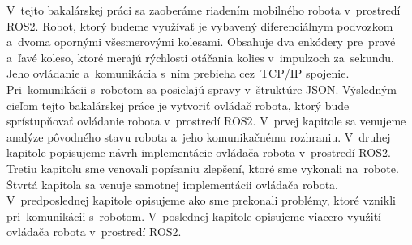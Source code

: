V~tejto bakalárskej práci sa zaoberáme riadením mobilného robota v~prostredí ROS2. Robot, ktorý budeme využívať
je vybavený diferenciálnym podvozkom a~dvoma opornými všesmerovými kolesami. Obsahuje dva enkódery pre~pravé
a~ľavé koleso, ktoré merajú rýchlosti otáčania kolies v~impulzoch za~sekundu. Jeho ovládanie a~komunikácia
s~ním prebieha cez~TCP/IP spojenie. Pri~komunikácii s~robotom sa posielajú spravy v~štruktúre JSON.
Výsledným cieľom tejto bakalárskej práce je vytvoriť ovládač robota, ktorý bude sprístupňovať ovládanie robota
v~prostredí ROS2. V~prvej kapitole sa venujeme analýze pôvodného stavu robota a~jeho komunikačnému rozhraniu.
V~druhej kapitole popisujeme návrh implementácie ovládača robota v~prostredí ROS2. Tretiu kapitolu sme venovali
popísaniu zlepšení, ktoré sme vykonali na~robote. Štvrtá kapitola sa venuje samotnej implementácii ovládača robota.
V~predposlednej kapitole opisujeme ako sme prekonali problémy, ktoré vznikli pri~komunikácii s~robotom. V~poslednej
kapitole opisujeme viacero využití ovládača robota v~prostredí ROS2.
